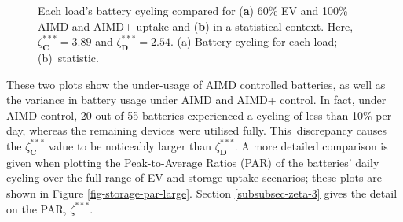 \begin{figure}[!h]\centering
 \hspace{5mm}
 \vspace{-6pt}
 \caption{Each load's battery cycling compared for (\textbf{a}) 60\% EV and 100\% AIMD and AIMD+ uptake  and (\textbf{b}) in a statistical context. Here, $\zeta_\textbf{C}^{***}=3.89$ and $\zeta_\textbf{D}^{***}=2.54$. ({a}) Battery cycling for each load; ({b})~statistic. }
 \label{fig-battery-cycling}
\end{figure}

These two plots show the under-usage of AIMD controlled batteries, as well as the variance in battery usage under AIMD and AIMD+ control. In fact, under AIMD control, 20 out of 55 batteries experienced a cycling of less than 10\% per day, whereas the remaining devices were utilised fully. This~discrepancy causes the $\zeta_\textbf{C}^{***}$ value to be noticeably larger than $\zeta_\textbf{D}^{***}$. A more detailed comparison is given when plotting the Peak-to-Average Ratios (PAR) of the batteries' daily cycling over the full range of EV and storage uptake scenarios; these plots are shown in Figure \ref{fig-storage-par-large}. Section \ref{subsubsec-zeta-3} gives the detail on the PAR, $\zeta^{***}$.\vspace{-12pt}


